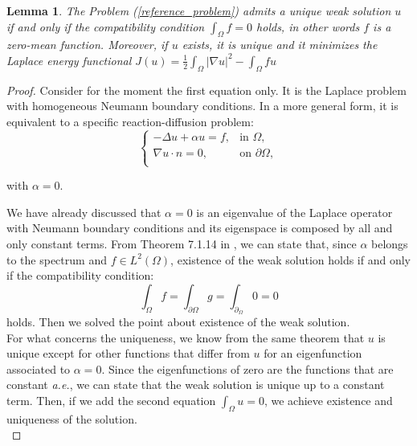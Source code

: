 \documentclass[a4paper,11pt]{article}
\newtheorem{lemma}{Lemma}
\begin{document}
\begin{lemma} \label{first_lemma}
	The Problem (\ref{reference_problem}) admits a unique weak solution $u$ if and only if the compatibility condition $\int_{\Omega} f = 0$ holds, in other words $f$ is a zero-mean function. Moreover, if $u$ exists, it is unique and it minimizes the Laplace energy functional $J(u) = \frac{1}{2}\int_{\Omega} |\nabla u |^2 - \int_{\Omega}fu$
\end{lemma} \vspace{1mm}
\begin{proof}
	Consider for the moment the first equation only. It is the Laplace problem with homogeneous Neumann boundary conditions. In a more general form, it is equivalent to a specific reaction-diffusion problem:
	\begin{equation*}
	\begin{cases}
	-\Delta{u} + \alpha u =f, & \text{in } \Omega,\\
	\nabla u \cdot n = 0, & \text{on } \partial \Omega, \\
	\end{cases}
	\end{equation*}
	\begin{center}
		with $\alpha = 0$.
	\end{center}
     We have already discussed that $\alpha=0$ is an eigenvalue of the Laplace operator with Neumann boundary conditions and its eigenspace is composed by all and only constant terms. From Theorem 7.1.14 in \cite{gazzola}, we can state that, since $\alpha$ belongs to the spectrum and $f\in L^2(\Omega)$, existence of the weak solution holds if and only if the compatibility condition:
     \begin{equation*}
     \int_{\Omega}f = \int_{\partial \Omega} g = \int_{\partial_\Omega} 0 = 0 
     \end{equation*}
     holds. Then we solved the point about existence of the weak solution. \\
     
     \noindent For what concerns the uniqueness, we know from the same theorem that $u$ is unique except for other functions that differ from $u$ for an eigenfunction associated to $\alpha=0$. Since the eigenfunctions of zero are the functions that are constant \emph{a.e.}, we can state that the weak solution is unique up to a constant term. Then, if we add the second equation $\int_{\Omega}u = 0$, we achieve existence and uniqueness of the solution. \\
     

\end{proof}
\end{document}
